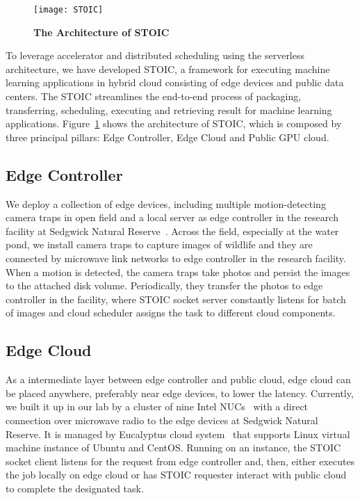 \begin{figure}
    \centering
    \texttt{[image: STOIC]}
    \caption{\textbf{The Architecture of STOIC}}
    \label{fig:STOIC}
\end{figure}

To leverage accelerator and distributed scheduling using the serverless architecture, we have developed STOIC, a framework for executing machine learning applications in hybrid cloud consisting of edge devices and public data centers. The STOIC streamlines the end-to-end process of packaging, transferring, scheduling, executing and retrieving result for machine learning applications. Figure~\ref{fig:STOIC} shows the architecture of STOIC, which is composed by three principal pillars: Edge Controller, Edge Cloud and Public GPU cloud.

\subsection{Edge Controller}
 We deploy a collection of edge devices, including multiple motion-detecting camera traps in open field and a local server as edge controller in the research facility at Sedgwick Natural Reserve~\cite{ref:sedgwick}. Across the field, especially at the water pond, we install camera traps to capture images of wildlife and they are connected by microwave link networks to edge controller in the research facility. When a motion is detected, the camera traps take photos and persist the images to the attached disk volume. Periodically, they transfer the photos to edge controller in the facility, where STOIC socket server constantly listens for batch of images and cloud scheduler assigns the task to different cloud components. 
 
 \subsection{Edge Cloud}
 
 As a intermediate layer between edge controller and public cloud, edge cloud can be placed anywhere, preferably near edge devices, to lower the latency. Currently, we built it up in our lab by a cluster of nine Intel NUCs~\cite{ref:nucs} with a direct connection over microwave radio to the edge devices at Sedgwick Natural Reserve. It is managed by Eucalyptus cloud system~\cite{ref:euca} that supports Linux virtual machine instance of Ubuntu and CentOS. Running on an instance, the STOIC socket client listens for the request from edge controller and, then, either executes the job locally on edge cloud or has STOIC requester interact with public cloud to complete the designated task.
 
